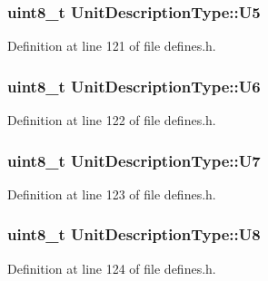 \hypertarget{structUnitDescriptionType_ab11845623074981c46cbe7af4a5964cd}{
\subsubsection[{U5}]{\setlength{\rightskip}{0pt plus 5cm}uint8\-\_\-t Unit\-Description\-Type\-::\-U5}}\label{structUnitDescriptionType_ab11845623074981c46cbe7af4a5964cd}


Definition at line 121 of file defines.\-h.

\hypertarget{structUnitDescriptionType_a8c7c9b56c879d736a289183fcee17b84}{
\subsubsection[{U6}]{\setlength{\rightskip}{0pt plus 5cm}uint8\-\_\-t Unit\-Description\-Type\-::\-U6}}\label{structUnitDescriptionType_a8c7c9b56c879d736a289183fcee17b84}


Definition at line 122 of file defines.\-h.

\hypertarget{structUnitDescriptionType_a9b90dfa70ea1e381a0ea6032ca804ad6}{
\subsubsection[{U7}]{\setlength{\rightskip}{0pt plus 5cm}uint8\-\_\-t Unit\-Description\-Type\-::\-U7}}\label{structUnitDescriptionType_a9b90dfa70ea1e381a0ea6032ca804ad6}


Definition at line 123 of file defines.\-h.

\hypertarget{structUnitDescriptionType_adea079c655e18cac88ad05a8243f22f8}{
\subsubsection[{U8}]{\setlength{\rightskip}{0pt plus 5cm}uint8\-\_\-t Unit\-Description\-Type\-::\-U8}}\label{structUnitDescriptionType_adea079c655e18cac88ad05a8243f22f8}


Definition at line 124 of file defines.\-h.

